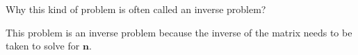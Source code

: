 Why this kind of problem is often called an inverse problem?

\begin{solution}
This problem is an inverse problem because the inverse of the matrix needs to be taken to solve for $\boldsymbol{n}$.
\end{solution}
